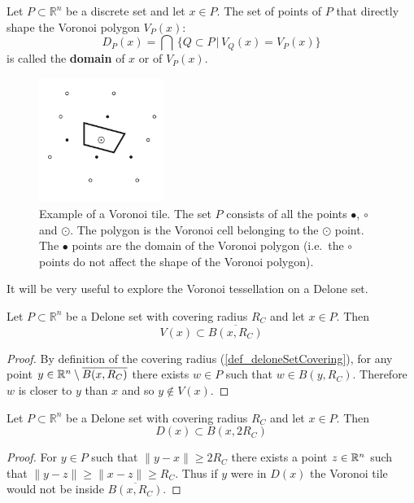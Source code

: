 \documentclass[text.tex]{subfiles}
\begin{document}
\begin{definition}
Let $P\subset \mathbb{R}^n$ be a discrete set and let $x\in P$. The set of points of $P$ that directly shape the Voronoi polygon $V_P(x)$:
$$D_P(x) = \bigcap\, \big\{ Q\subset P\,|\, V_Q(x) = V_P(x) \big\}$$
is called the \textbf{domain} of $x$ or of $V_P(x)$. 
\end{definition}

\begin{figure}[h!]
\centering
\includegraphics[width=0.36\textwidth]{img/preliminaries/voronoi}
\caption{Example of a Voronoi tile. The set $P$ consists of all the points $\bullet$, $\circ$ and $\odot$. The polygon is the Voronoi cell belonging to the $\odot$ point. The $\bullet$ points are the domain of the Voronoi polygon (i.e.\ the $\circ$ points do not affect the shape of the Voronoi polygon).}
\label{fig_voronoiExample}
\end{figure}

It will be very useful to explore the Voronoi tessellation on a Delone set. 

\begin{theorem}
Let $P\subset \mathbb{R}^n$ be a Delone set with covering radius $R_C$ and let $x\in P$. Then 
$$V(x)\subset \overline{B(x,R_C)}$$
\end{theorem}
\begin{proof}
By definition of the covering radius (\ref{def_deloneSetCovering}), for any point $y\in \mathbb{R}^n\setminus \overline{B(x,R_C)}$ there exists $w\in P$ such that $w\in B(y,R_C)$. Therefore $w$ is closer to $y$ than $x$ and so $y\not\in V(x)$.
\end{proof}

\begin{theorem}\label{the_voronoiDomainLimit}
Let $P\subset \mathbb{R}^n$ be a Delone set with covering radius $R_C$ and let $x\in P$. Then 
$$D(x)\subset B(x,2R_C)$$
\end{theorem}
\begin{proof}
For $y\in P$ such that $\lVert y-x \rVert \geq 2R_C$ there exists a point $z\in\mathbb{R}^n$ such that $\lVert y-z\rVert\geq\lVert x-z\rVert \geq R_C$. Thus if $y$ were in $D(x)$ the Voronoi tile would not be inside $\overline{B(x,R_C)}$. 
\end{proof}
\end{document}

